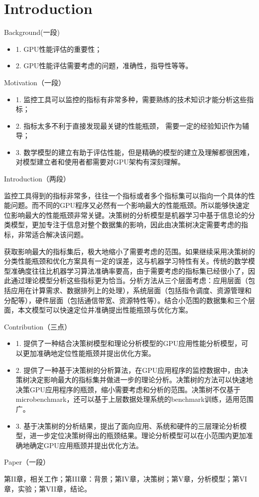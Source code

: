 \section{Introduction}

Background(一段) 

\begin{itemize}
\item 1. GPU性能评估的重要性；
\item 2. GPU性能评估需要考虑的问题，准确性，指导性等等。
\end{itemize}

Motivation（一段） 

\begin{itemize}
\item 1. 监控工具可以监控的指标有非常多种，需要熟练的技术知识才能分析这些指标；
\item 2. 指标太多不利于直接发现最关键的性能瓶颈，
需要一定的经验知识作为辅导；
\item 3. 数学模型的建立有助于评估性能，但是精确的模型的建立及理解都很困难，对模型建立者和使用者都需要对GPU架构有深刻理解。
\end{itemize}

Introduction（两段） 

监控工具得到的指标非常多，往往一个指标或者多个指标集可以指向一个具体的性能问题。而不同的GPU程序又必然有一个影响最大的性能瓶颈。所以能够快速定位影响最大的性能瓶颈非常关键。决策树的分析模型是机器学习中基于信息论的分类模型，更加专注于信息对整个数据集的影响，因此由决策树决定需要考虑的指标，非常适合解决该问题。

获取影响最大的指标集后，极大地缩小了需要考虑的范围。如果继续采用决策树的分类性能瓶颈和优化方案具有一定的误差，这与机器学习特性有关。传统的数学模型准确度往往比机器学习算法准确率要高，由于需要考虑的指标集已经很小了，因此通过理论模型分析这些指标更为恰当。分析方法从三个层面考虑：应用层面（包括应用在计算需求、数据排列上的处理），系统层面（包括指令调度、资源管理和分配等），硬件层面（包括通信带宽、资源特性等）。结合小范围的数据集和三个层面，本文模型可以快速定位并准确提出性能瓶颈与优化方案。

Contribution（三点） 

\begin{itemize}
\item 1. 提供了一种结合决策树模型和理论分析模型的GPU应用性能分析模型，可以更加准确地定位性能瓶颈并提出优化方案。
\item 2. 提供了一种基于决策树的分析算法，在GPU应用程序的监控数据中，由决策树决定影响最大的指标集并做进一步的理论分析。决策树的方法可以快速地决策GPU应用程序的瓶颈，缩小需要考虑和分析的范围。决策树不仅基于microbenchmark，还可以基于上层数据处理系统的benchmark训练，适用范围广。
\item 3. 基于决策树的分析结果，提出了面向应用、系统和硬件的三层理论分析模型，进一步定位决策树得出的瓶颈结果。理论分析模型可以在小范围内更加准确地确定GPU应用瓶颈并提出优化方法。
\end{itemize}

Paper（一段） 

第II章，相关工作；第III章：背景；第IV章，决策树；第V章，分析模型；第VI章，实验；第VII章，结论。